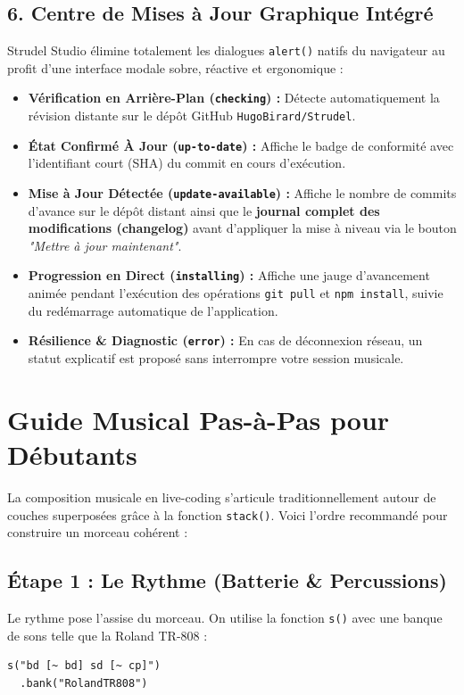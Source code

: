 \documentclass[a4paper,10pt]{article}
\begin{document}
\subsection{6. Centre de Mises à Jour Graphique Intégré}
Strudel Studio élimine totalement les dialogues \texttt{alert()} natifs du navigateur au profit d'une interface modale sobre, réactive et ergonomique :
\begin{itemize}
    \item \textbf{Vérification en Arrière-Plan (\texttt{checking}) :} Détecte automatiquement la révision distante sur le dépôt GitHub \texttt{HugoBirard/Strudel}.
    \item \textbf{État Confirmé À Jour (\texttt{up-to-date}) :} Affiche le badge de conformité avec l'identifiant court (SHA) du commit en cours d'exécution.
    \item \textbf{Mise à Jour Détectée (\texttt{update-available}) :} Affiche le nombre de commits d'avance sur le dépôt distant ainsi que le \textbf{journal complet des modifications (changelog)} avant d'appliquer la mise à niveau via le bouton \textit{"Mettre à jour maintenant"}.
    \item \textbf{Progression en Direct (\texttt{installing}) :} Affiche une jauge d'avancement animée pendant l'exécution des opérations \texttt{git pull} et \texttt{npm install}, suivie du redémarrage automatique de l'application.
    \item \textbf{Résilience \& Diagnostic (\texttt{error}) :} En cas de déconnexion réseau, un statut explicatif est proposé sans interrompre votre session musicale.
\end{itemize}

\newpage

\section{Guide Musical Pas-à-Pas pour Débutants}
La composition musicale en live-coding s'articule traditionnellement autour de couches superposées grâce à la fonction \texttt{stack()}. Voici l'ordre recommandé pour construire un morceau cohérent :

\subsection{Étape 1 : Le Rythme (Batterie \& Percussions)}
Le rythme pose l'assise du morceau. On utilise la fonction \texttt{s()} avec une banque de sons telle que la Roland TR-808 :
\begin{verbatim}
s("bd [~ bd] sd [~ cp]")
  .bank("RolandTR808")
\end{verbatim}
\end{document}
